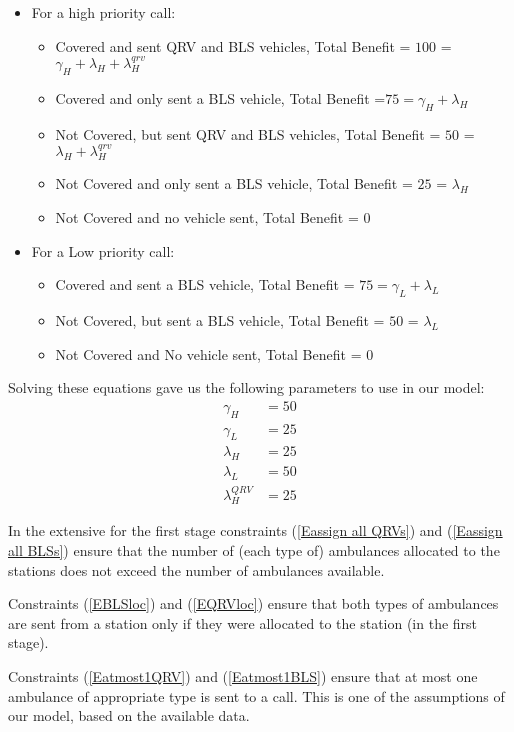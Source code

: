\documentclass[12pt]{report}
\begin{document}
\begin{itemize}
    \item For a high priority call:
        \begin{itemize}
            \item Covered and sent QRV and BLS vehicles, Total Benefit = $100$ = $\gamma_H + \lambda_H + \lambda_H^{qrv}$
            \item Covered and only sent a BLS vehicle, Total Benefit =$75 = \gamma_H + \lambda_H$
            \item Not Covered, but sent QRV and BLS vehicles, Total Benefit = $50$ = $\lambda_H + \lambda_H^{qrv}$
            \item Not Covered and only sent a BLS vehicle, Total Benefit = $25$ = $\lambda_H$
            \item Not Covered and no vehicle sent, Total Benefit = 0
        \end{itemize}
    \item For a Low priority call:
        \begin{itemize}
            \item Covered and sent a BLS vehicle, Total Benefit = $75 = \gamma_L + \lambda_L$
            \item Not Covered, but sent a BLS vehicle, Total Benefit = $50$ = $\lambda_L$
            \item Not Covered and No vehicle sent, Total Benefit = 0
        \end{itemize}
\end{itemize}
Solving these equations gave us the following parameters to use in our model:
\begin{align*}
   \gamma_H &= 50 \\
    \gamma_L &= 25 \\
    \lambda_H &= 25\\
    \lambda_L &= 50\\
    \lambda_H^{QRV} &= 25 
\end{align*}

In the extensive for the first stage constraints (\ref{Eassign all QRVs}) and (\ref{Eassign all BLSs}) ensure that the number of (each type of) ambulances allocated to the stations does not exceed the number of ambulances available.

Constraints (\ref{EBLSloc}) and (\ref{EQRVloc}) ensure that both types of ambulances are sent from a station only if they were allocated to the station (in the first stage).

Constraints (\ref{Eatmost1QRV}) and (\ref{Eatmost1BLS}) ensure that at most one ambulance of appropriate type is sent to a call. This is one of the assumptions of our model, based on the available data.
\end{document}
